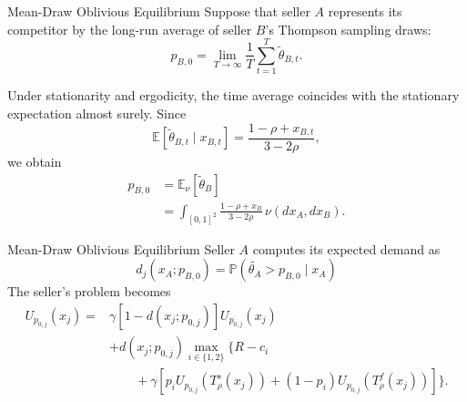 \documentclass[10pt]{beamer}
\begin{document}
\begin{frame}{Mean-Draw Oblivious Equilibrium}
    Suppose that seller $A$ represents its competitor
    by the long-run average of seller $B$'s
    Thompson sampling draws:
    \begin{equation}
        p_{B,0}
        =
        \lim_{T\to\infty}
        \frac{1}{T}
        \sum_{t=1}^{T}\widetilde{\theta}_{B,t}.
    \end{equation}

    Under stationarity and ergodicity, the time average
    coincides with the stationary expectation almost surely.
    Since
    \begin{equation}
    \mathbb{E}[\widetilde{\theta}_{B,t}\mid x_{B,t}]
    =
    \frac{1-\rho+x_{B,t}}{3-2\rho},
    \end{equation}
    we obtain
    \begin{equation}
    \begin{aligned}
    p_{B,0}
    &=\mathbb{E}_{\nu}[\widetilde{\theta}_B]\\
    &=\int_{[0,1]^2}
    \frac{1-\rho+x_B}{3-2\rho}
    \,\nu(dx_A,dx_B).
    \end{aligned}
    \end{equation}
        
\end{frame}

\begin{frame}{Mean-Draw Oblivious Equilibrium}
    Seller $A$ computes its expected demand as 
    \begin{equation}
        d_j(x_A;p_{B,0}) = \mathbb{P}(\tilde{\theta_A}>p_{B,0} \mid x_A)
    \end{equation}
    The seller's problem becomes 
    \begin{equation}
        \begin{aligned}
            U_{p_{0,j}}(x_j) ={}& \gamma[1-d(x_j;p_{0,j})]U_{p_{0,j}}(x_j)\\
            & + d(x_j;p_{0,j}) \max_{i\in\{1,2\}} \Big\{ R-c_i\\
            &\qquad+ \gamma\left[ p_iU_{p_{0,j}}(T_\rho^s(x_j)) + (1-p_i)U_{p_{0,j}}(T_\rho^f(x_j)) \right] \Big\}.
        \end{aligned}
    \end{equation}
\end{frame}
\end{document}
